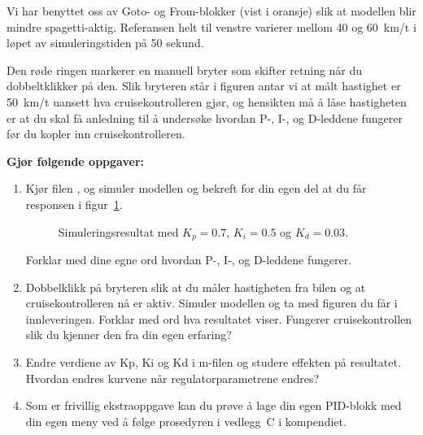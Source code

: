 Vi har benyttet oss av {\sf  Goto}- og
{\sf   From}-blokker (vist i oransje) slik at modellen blir mindre
spagetti-aktig.  Referansen  helt til venstre
varierer mellom 40 og 60~km/t i løpet av simuleringstiden på 50 sekund.

Den røde ringen markerer en manuell bryter som skifter retning når du
dobbeltklikker på den. Slik bryteren står i figuren antar vi at målt hastighet er
50~km/t uansett hva cruisekontrolleren gjør, og hensikten må å låse
hastigheten er at du skal få anledning til å undersøke hvordan P-, I-,
og D-leddene fungerer før du kopler inn cruisekontrolleren. 

\newpage
    {\bf Gjør følgende oppgaver:    }
    
  \begin{enumerate}[label=q\arabic*)]
  \item  Kjør  filen , og simuler modellen og
    bekreft for din egen del at du får responsen i figur~\ref{fig:dump_2q}.
     
  \begin{figure}[H]
    \centering
    \hspace*{10mm}
    \caption{Simuleringsresultat med $K_{p}{=}0.7$, $K_{i}{=}0.5$ og $K_{d}{=}0.03$. }
    \label{fig:dump_2q}
  \end{figure}

  Forklar med dine egne ord hvordan P-, I-, og
  D-leddene fungerer. 

  \item Dobbelklikk på bryteren slik at du måler hastigheten fra
    bilen og at cruisekontrolleren nå er aktiv. Simuler modellen og ta
    med figuren du får i innleveringen. 
    Forklar med ord hva resultatet viser. Fungerer cruisekontrollen
    slik du kjenner den fra din egen erfaring?
  
\item  Endre verdiene av {\sf  Kp}, {\sf  Ki} og
  {\sf  Kd} i m-filen og studere effekten på resultatet. Hvordan
  endres kurvene når regulatorparametrene endres? 
    

 \item Som er frivillig ekstraoppgave kan du prøve å lage din egen
   PID-blokk med din egen meny ved å følge prosedyren i vedlegg~C i kompendiet. 
  
\end{enumerate}




 
